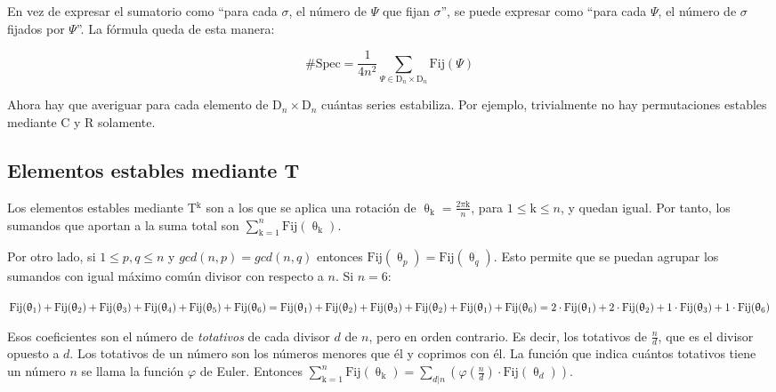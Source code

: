 		En vez de expresar el sumatorio como ``para cada $\sigma$, el número de $\Psi$ que fijan $\sigma$'', se puede expresar como ``para cada $\Psi$, el número de $\sigma$ fijados por $\Psi$''. La fórmula queda de esta manera:
		
		\[\#\text{Spec}=\frac{1}{4n^2}\sum_{\Psi\in\text{D}_{n}\times\text{D}_{n}}\text{Fij}(\Psi)\] 
		
		Ahora hay que averiguar para cada elemento de $\text{D}_{n}\times\text{D}_{n}$ cuántas series estabiliza. Por ejemplo, trivialmente no hay permutaciones estables mediante C y R solamente.
		
		\subsection{Elementos estables mediante T}
		
		Los elementos estables mediante T$^\text{k}$ son a los que se aplica una rotación de $\uptheta_\text{k}=\frac{2\pi\text{k}}{n}$, para $1\leq\text{k}\leq n$, y quedan igual. Por tanto, los sumandos que aportan a la suma total son $\sum_{\text{k}=1}^{n}\text{Fij}(\uptheta_\text{k})$.
		
		Por otro lado, si $1\leq p,q\leq n$ y $gcd(n,p)=gcd(n,q)$ entonces $\text{Fij}(\uptheta_p)=\text{Fij}(\uptheta_q)$. Esto permite que se puedan agrupar los sumandos con igual máximo común divisor con respecto a $n$. Si $n=6$: 
		
		$\text{Fij}(\uptheta_\text{1})+\text{Fij}(\uptheta_\text{2})+\text{Fij}(\uptheta_\text{3})+\text{Fij}(\uptheta_\text{4})+\text{Fij}(\uptheta_\text{5})+\text{Fij}(\uptheta_\text{6})=\\%
		\text{Fij}(\uptheta_\text{1})+\text{Fij}(\uptheta_\text{2})+\text{Fij}(\uptheta_\text{3})+\text{Fij}(\uptheta_\text{2})+\text{Fij}(\uptheta_\text{1})+\text{Fij}(\uptheta_\text{6})=\\%
		2\cdot\text{Fij}(\uptheta_\text{1})+2\cdot\text{Fij}(\uptheta_\text{2})+1\cdot\text{Fij}(\uptheta_\text{3})+1\cdot\text{Fij}(\uptheta_\text{6})$
		
		Esos coeficientes son el número de \textit{totativos} de cada divisor $d$ de $n$, pero en orden contrario. Es decir, los totativos de $\frac{n}{d}$, que es el divisor opuesto a $d$. Los totativos de un número son los números menores que él y coprimos con él. La función que indica cuántos totativos tiene un número $n$ se llama la función $\varphi$ de Euler. Entonces $\sum_{\text{k}=1}^{n}\text{Fij}(\uptheta_\text{k})=\sum_{d|n}\left(\varphi(\frac{n}{d})\cdot\text{Fij}(\uptheta_d)\right)$.
		
